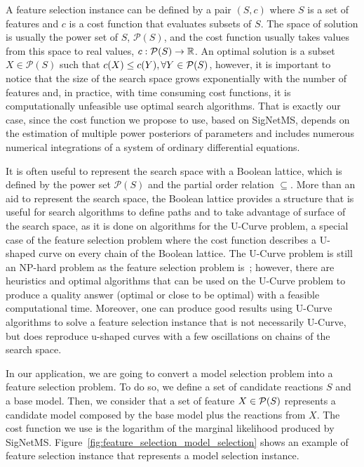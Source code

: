 %
%
A feature selection instance can be defined by a pair $(S, c)$ where $S$
is a set of features and $c$ is a cost function that evaluates subsets
of $S$. The space of solution is usually the power set of $S$,
$\mathcal{P}(S)$, and the cost function usually takes values from this 
space to real values, $c: \mathcal{P}(S) \to \mathbb{R}$. An
optimal solution is a subset $X \in \mathcal{P}(S)$ such that $c(X) \leq
c(Y), \forall Y \in \mathcal{P} (S)$, however, it is important to notice
that the size of the search space grows exponentially with the number of
features and, in practice, with time consuming cost functions, it is
computationally unfeasible use optimal search algorithms. That is
exactly our case, since the cost function we propose to use, based on
SigNetMS, depends on the estimation of multiple power posteriors of
parameters and includes numerous numerical integrations of a system of
ordinary differential equations.

It is often useful to represent the search space with a Boolean lattice, 
which is defined by the power set $\mathcal{P}(S)$ and the partial order 
relation $\subseteq$. More than an aid to represent the search space,
the Boolean lattice provides a structure that is useful for search
algorithms to define paths and to take advantage of surface of the 
search space, as it is done on algorithms for the U-Curve problem, a 
special case of the feature selection problem where the cost function 
describes a U-shaped curve on every chain of the Boolean lattice. The
U-Curve problem is still an NP-hard problem as the feature selection
problem is~\cite{Rei12}; however, there are heuristics and optimal
algorithms that can be used on the U-Curve problem to produce a quality
answer (optimal or close to be optimal) with a feasible computational
time. Moreover, one can produce good results using U-Curve algorithms to 
solve a feature selection instance that is not necessarily U-Curve, but
does reproduce u-shaped curves with a few oscillations on chains of the
search space.

In our application, we are going to convert a model selection problem
into a feature selection problem. To do so, we define a set of candidate
reactions $S$ and a base model. Then, we consider that a set of feature
$X \in \mathcal{P} (S)$ represents a candidate model composed by the base
model plus the reactions from $X$. The cost function we use is the
logarithm of the marginal likelihood produced by SigNetMS.
Figure~\ref{fig:feature_selection_model_selection} shows an example of
feature selection instance that represents a model selection instance.

